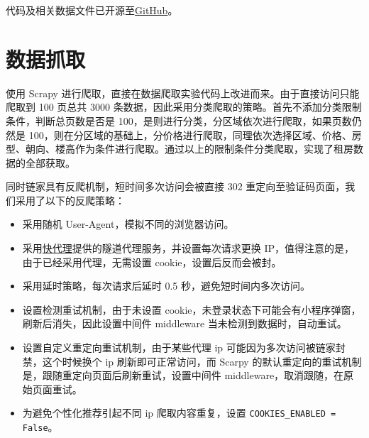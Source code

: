 代码及相关数据文件已开源至\href{https://github.com/Word2VecT/Lianjia-Spider-Demo}{GitHub}。

\section{数据抓取}

使用 Scrapy 进行爬取，直接在数据爬取实验代码上改进而来。由于直接访问只能爬取到 100 页总共 3000 条数据，因此采用分类爬取的策略。首先不添加分类限制条件，判断总页数是否是 100，是则进行分类，分区域依次进行爬取，如果页数仍然是 100，则在分区域的基础上，分价格进行爬取，同理依次选择区域、价格、房型、朝向、楼高作为条件进行爬取。通过以上的限制条件分类爬取，实现了租房数据的全部获取。

同时链家具有反爬机制，短时间多次访问会被直接 302 重定向至验证码页面，我们采用了以下的反爬策略：\begin{itemize}
    \item 采用随机 User-Agent，模拟不同的浏览器访问。
    \item 采用\href{https://www.kuaidaili.com}{快代理}提供的隧道代理服务，并设置每次请求更换 IP，值得注意的是，由于已经采用代理，无需设置 cookie，设置后反而会被封。
    \item 采用延时策略，每次请求后延时 0.5 秒，避免短时间内多次访问。
    \item 设置检测重试机制，由于未设置 cookie，未登录状态下可能会有小程序弹窗，刷新后消失，因此设置中间件 middleware 当未检测到数据时，自动重试。
    \item 设置自定义重定向重试机制，由于某些代理 ip 可能因为多次访问被链家封禁，这个时候换个 ip 刷新即可正常访问，而 Scarpy 的默认重定向的重试机制是，跟随重定向页面后刷新重试，设置中间件 middleware，取消跟随，在原始页面重试。
    \item 为避免个性化推荐引起不同 ip 爬取内容重复，设置 \texttt{COOKIES\_ENABLED = False}。
\end{itemize}

